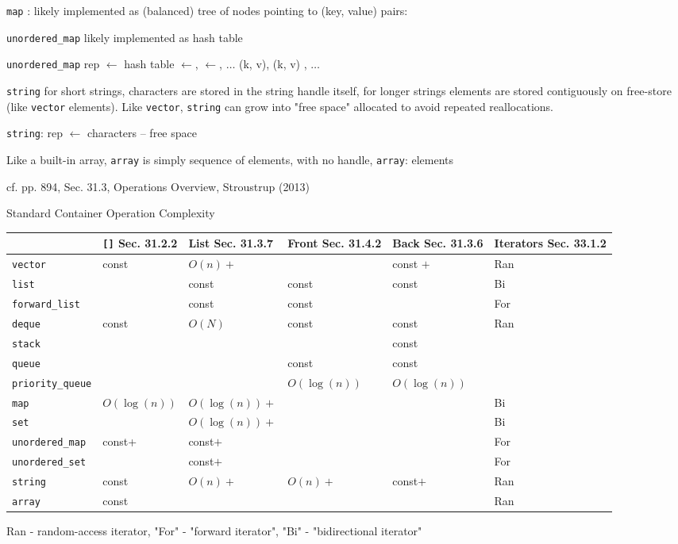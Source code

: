 \documentclass[10pt]{amsart}
\begin{document}
\begin{multicols*}{2}
\verb|map| : likely implemented as (balanced) tree of nodes pointing to (key, value) pairs:

\verb|unordered_map| likely implemented as hash table

\verb|unordered_map| rep $\leftarrow $ hash table $\leftarrow$, $\leftarrow$, $\dots$ (k, v), (k, v) , $\dots$

\verb|string| for short strings, characters are stored in the string handle itself, for longer strings elements are stored contiguously on free-store (like \verb|vector| elements). Like \verb|vector|, \verb|string| can grow into "free space" allocated to avoid repeated reallocations.

\verb|string|: rep $\leftarrow$ characters -- free space

Like a built-in array, \verb|array| is simply sequence of elements, with no handle,
\verb|array|: elements

cf. pp. 894, Sec. 31.3, Operations Overview, Stroustrup (2013) \cite{Stro2013}

Standard Container Operation Complexity
\begin{center}
	\begin{tabular}{ l | l | l | l | l | l }
		\hline
		& \verb|[]| Sec. 31.2.2 & List Sec. 31.3.7 & Front Sec. 31.4.2 & Back Sec. 31.3.6 & Iterators  Sec. 33.1.2 \\ \hline \hline
		\verb|vector| & const & $O(n)+$ &  & const $+$ & Ran \\ \hline 
		\verb|list| &  & const &  const  & const & Bi \\ \hline 
		\verb|forward_list| &  & const &  const  &  & For \\ \hline 
		\verb|deque| & const & $O(N)$ &  const  & const & Ran \\ \hline \hline 
		\verb|stack| &  &  &   & const &  \\ \hline 
		\verb|queue| &  &  & const  & const &  \\ \hline 
		\verb|priority_queue| &  &  & $O(\log{(n)})$  & $O(\log{(n)})$ &  \\ \hline \hline
		\verb|map| & $O(\log{(n)})$ & $O(\log{(n)})+$ & & & Bi \\ \hline
		\verb|set| &  & $O(\log{(n)})+$ & & & Bi \\ \hline
		\verb|unordered_map| & const+ & const$+$ & & & For \\ \hline
		\verb|unordered_set| &  & const$+$ & & & For \\ \hline \hline 
		\verb|string| & const & $O(n)+$ & $O(n)+$ & const$+$ & Ran \\ \hline
		\verb|array| & const &  & & & Ran \\ \hline 	
		\hline
	\end{tabular}
\end{center}
Ran - random-access iterator, "For" - "forward iterator", "Bi" - "bidirectional iterator"


\end{multicols*}
\end{document}
